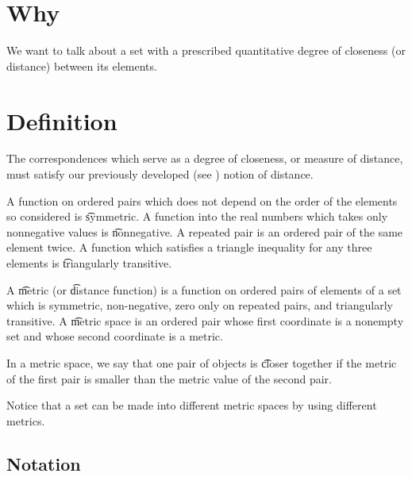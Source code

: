 
\section*{Why}

We want to talk about a set with a prescribed quantitative degree of closeness (or distance) between its elements.

\section*{Definition}

The correspondences which serve as a degree of closeness, or measure of distance, must satisfy our previously developed (see ) notion of distance.

A function on ordered pairs which does not depend on the order of the elements so considered is \t{symmetric}.
A function into the real numbers which takes only nonnegative values is \t{nonnegative}.
A repeated pair is an ordered pair of the same element twice.
A function which satisfies a triangle inequality for any three elements is \t{triangularly transitive}.

A \t{metric} (or \t{distance function}) is a function on ordered pairs of elements of a set which is symmetric, non-negative, zero only on repeated pairs, and triangularly transitive.
A \t{metric space} is an ordered pair whose first coordinate is a nonempty set and whose second coordinate is a metric.

In a metric space, we say that one pair of objects is \t{closer} together if the metric of the first pair is smaller than the metric value of the second pair.

Notice that a set can be made into different metric spaces by using different metrics.

\subsection*{Notation}

